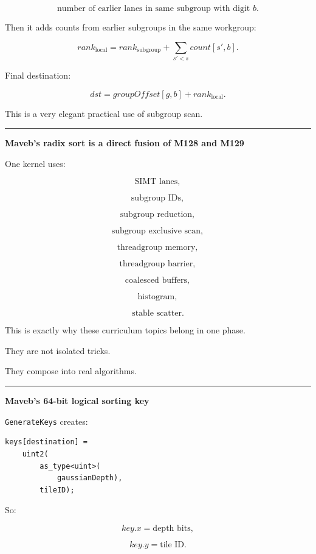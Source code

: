 \[
\text{number of earlier lanes in same subgroup with digit }b.
\]

Then it adds counts from earlier subgroups in the same workgroup:

\[
rank_{\text{local}}
=
rank_{\text{subgroup}}
+
\sum_{s'<s}
count[s',b].
\]

Final destination:

\[
\boxed{
dst=
groupOffset[g,b]
+
rank_{\text{local}}.
}
\]

This is a very elegant practical use of subgroup scan.

\begin{center}\rule{0.5\linewidth}{0.5pt}\end{center}

\textbf{Maveb's radix sort is a direct fusion of M128 and M129}

One kernel uses:

\[
\text{SIMT lanes},
\]

\[
\text{subgroup IDs},
\]

\[
\text{subgroup reduction},
\]

\[
\text{subgroup exclusive scan},
\]

\[
\text{threadgroup memory},
\]

\[
\text{threadgroup barrier},
\]

\[
\text{coalesced buffers},
\]

\[
\text{histogram},
\]

\[
\text{stable scatter}.
\]

This is exactly why these curriculum topics belong in one phase.

They are not isolated tricks.

They compose into real algorithms.

\begin{center}\rule{0.5\linewidth}{0.5pt}\end{center}

\textbf{Maveb's 64-bit logical sorting key}

\texttt{GenerateKeys} creates:

\protect{}\label{e9dtbb}%
\begin{verbatim}
keys[destination] =
    uint2(
        as_type<uint>(
            gaussianDepth),
        tileID);
\end{verbatim}

So:

\[
key.x=\text{depth bits},
\]

\[
key.y=\text{tile ID}.
\]

